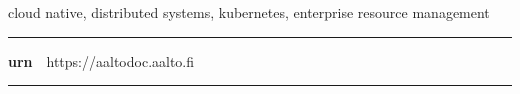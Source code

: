 \begin{spacing}{.88}
{\parindent0pt %

\parbox[t]{123.6mm}{\raggedright\small cloud native, distributed systems, kubernetes, enterprise resource management}

\vspace{.5mm}\rule{\textwidth}{.75pt}

{\fontsize{10.5pt}{10.5pt}\bfseries\sffamily\lsstyle urn}~~{\small https://aaltodoc.aalto.fi}

\vspace{-2.4mm}\rule{\textwidth}{.75pt}

} %
\end{spacing}














